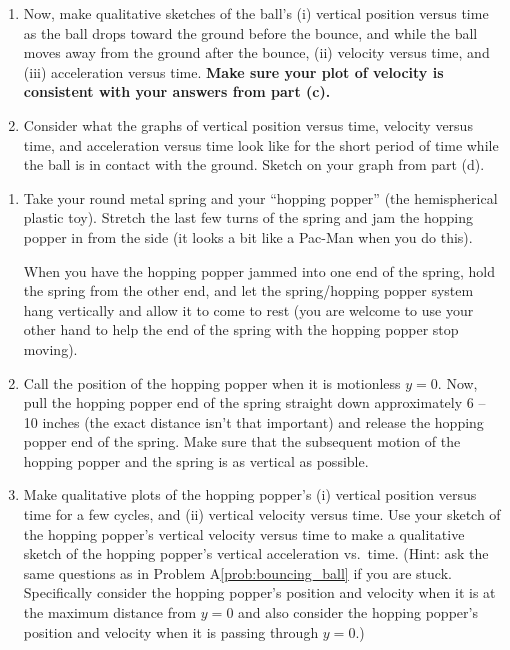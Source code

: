 \begin{exercise}
\begin{enumerate}
  \item Now, make qualitative sketches of the ball's (i) vertical
    position versus time as the ball drops toward the ground before
    the bounce, and while the ball moves away from the ground after
    the bounce, (ii) velocity versus time, and (iii) acceleration
    versus time.  \textbf{Make sure your plot of velocity is consistent 
    with your answers from part (c).}

  \item Consider what the graphs of vertical position versus time,
    velocity versus time, and acceleration versus time look like for
    the short period of time while the ball is in contact with the
    ground.  Sketch on your graph from part (d).
 
  \end{enumerate}
  \label{prob:bouncing_ball}
\end{exercise}

\begin{exercise}
  \begin{enumerate}
  \item Take your round metal spring and your ``hopping popper'' (the
    hemispherical plastic toy). Stretch the last few turns of the spring and jam the hopping popper in from the side (it looks a
    bit like a Pac-Man when you do this).
    
    When you have the hopping popper jammed into one end of the spring, 
    hold the spring from the other end, and let the
    spring/hopping popper system hang vertically and allow it to come to rest
    (you are welcome to use your other hand to help the end of the
    spring with the hopping popper stop moving). 
 
  \item Call the position of the hopping popper when it is motionless $y = 0$.
    Now, pull the hopping popper end of the spring straight down approximately 6
    -- 10 inches (the exact distance isn't that important) and release
    the hopping popper end of the spring.  Make sure that the subsequent motion
    of the hopping popper and the spring is as vertical as possible.

  \item Make qualitative plots of the hopping popper's (i) vertical position
    versus time for a few cycles, and (ii) vertical velocity versus
    time.  Use your sketch of the hopping popper's vertical velocity versus time
    to make a qualitative sketch of the hopping popper's vertical acceleration
    vs.\ time.  (Hint: ask the same questions as in Problem
    A\ref{prob:bouncing_ball} if you are stuck.  Specifically consider
    the hopping popper's position and velocity when it is at the maximum
    distance from $y = 0$ and also consider the hopping popper's position and
    velocity when it is passing through $y = 0$.)
  \end{enumerate}
  \label{prob:graphII}
\end{exercise}


